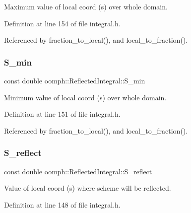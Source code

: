 Maximum value of local coord (s) over whole domain. 



Definition at line 154 of file integral.\+h.



Referenced by fraction\+\_\+to\+\_\+local(), and local\+\_\+to\+\_\+fraction().

\mbox{\label{classoomph_1_1ReflectedIntegral_a9284add785f137dc8a9fe67ffee61a8a}} 
\subsubsection{\texorpdfstring{S\+\_\+min}{S\_min}}
{\footnotesize\ttfamily const double oomph\+::\+Reflected\+Integral\+::\+S\+\_\+min\hspace{0.3cm}{\ttfamily [private]}}



Minimum value of local coord (s) over whole domain. 



Definition at line 151 of file integral.\+h.



Referenced by fraction\+\_\+to\+\_\+local(), and local\+\_\+to\+\_\+fraction().

\mbox{\label{classoomph_1_1ReflectedIntegral_a9f279264ea2f217727ecef0f911c4dc8}} 
\subsubsection{\texorpdfstring{S\+\_\+reflect}{S\_reflect}}
{\footnotesize\ttfamily const double oomph\+::\+Reflected\+Integral\+::\+S\+\_\+reflect\hspace{0.3cm}{\ttfamily [private]}}



Value of local coord (s) where scheme will be reflected. 



Definition at line 148 of file integral.\+h.

